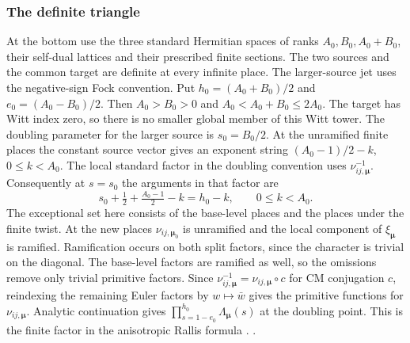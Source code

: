 \subsubsection{The definite triangle}\label{sec:period-definite-triangle}
At the bottom use the three standard Hermitian spaces of ranks
\(A_0,B_0,A_0+B_0\), their self-dual lattices and their prescribed
finite sections. The two sources and the common target are definite
at every infinite place. The larger-source jet uses the
negative-sign Fock convention. Put \(h_0=(A_0+B_0)/2\) and
\(e_0=(A_0-B_0)/2\). Then \(A_0>B_0>0\) and
\(A_0<A_0+B_0\le 2A_0\). The target has Witt index zero, so there
is no smaller global member of this Witt tower. The doubling
parameter for the larger source is \(s_0=B_0/2\). At the unramified
finite places the constant source vector gives an exponent string
\((A_0-1)/2-k\), \(0\le k<A_0\). The local standard factor
in the doubling convention uses \(\nu_{ij,\boldsymbol\mu}^{-1}\).
Consequently at \(s=s_0\) the arguments in that factor are
\[
  s_0+\tfrac12+\tfrac{A_0-1}{2}-k=h_0-k,\qquad 0\le k<A_0 .
\]
The exceptional set here consists of the base-level places and the
places under the finite twist. At the new places
\(\nu_{ij,\boldsymbol\mu_0}\) is unramified and the local component
of \(\xi_{\boldsymbol\mu}\) is ramified. Ramification occurs on both
split factors, since the character is trivial on the diagonal.
The base-level factors are ramified as well, so the omissions
remove only trivial primitive factors. Since
\(\nu_{ij,\boldsymbol\mu}^{-1}=\nu_{ij,\boldsymbol\mu}\circ c\)
for CM conjugation \(c\), reindexing the remaining Euler factors by
\(w\mapsto\bar w\) gives the primitive functions for \(\nu_{ij,\boldsymbol\mu}\).
Analytic continuation gives
\(\prod_{s=1-e_0}^{h_0}\Lambda_{\boldsymbol\mu}(s)\)
at the doubling point. This is the finite factor in the anisotropic
Rallis formula \cite[S\S7.1, 11.3--11.7]{gqt}.
.

